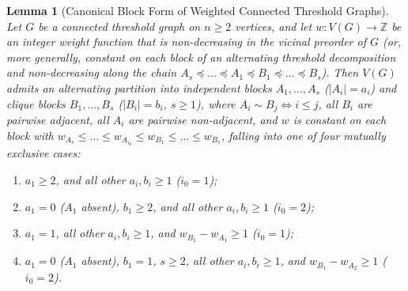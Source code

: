 \documentclass[11pt,a4paper]{article}
\newtheorem{lemma}[theorem]{Lemma}
\theoremstyle{definition}
\begin{document}
\begin{lemma}[Canonical Block Form of Weighted Connected Threshold Graphs]\label{lem:thresh_canon}
  Let $G$ be a connected threshold graph on $n \ge 2$ vertices, and let $w : V(G) \to \mathbb{Z}$ be an integer weight function that is non-decreasing in the vicinal preorder of $G$ (or, more generally, constant on each block of an alternating threshold decomposition and non-decreasing along the chain $A_s \preceq \dots \preceq A_1 \preceq B_1 \preceq \dots \preceq B_s$). Then $V(G)$ admits an alternating partition into independent blocks $A_1,\dots,A_s$ ($|A_i|=a_i$) and clique blocks $B_1,\dots,B_s$ ($|B_i|=b_i$, $s \ge 1$), where $A_i \sim B_j \iff i \le j$, all $B_i$ are pairwise adjacent, all $A_i$ are pairwise non-adjacent, and $w$ is constant on each block with $w_{A_s} \le \dots \le w_{A_{i_0}} \le w_{B_1} \le \dots \le w_{B_s}$, falling into one of four mutually exclusive cases:
  \begin{enumerate}
    \item[(I)] $a_1 \ge 2$, and all other $a_i, b_i \ge 1$ ($i_0 = 1$);
    \item[(II)] $a_1 = 0$ ($A_1$ absent), $b_1 \ge 2$, and all other $a_i, b_i \ge 1$ ($i_0 = 2$);
    \item[(III)] $a_1 = 1$, all other $a_i, b_i \ge 1$, and $w_{B_1} - w_{A_1} \ge 1$ ($i_0 = 1$);
    \item[(IV)] $a_1 = 0$ ($A_1$ absent), $b_1 = 1$, $s \ge 2$, all other $a_i, b_i \ge 1$, and $w_{B_1} - w_{A_2} \ge 1$ ($i_0 = 2$).
  \end{enumerate}
\end{lemma}
\end{document}
